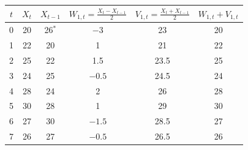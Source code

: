 \begin{tabular}{cccccc}
\toprule
$t$ & $X_t$ & $X_{t-1}$ & $W_{1,t}=\frac{X_t-X_{t-1}}{2}$ & $V_{1,t}=\frac{X_t+X_{t-1}}{2}$ & $W_{1,t}+V_{1,t}$ \\
\midrule
0 & 20 & 26$^{\ast}$ & $-3$ & 23 & 20 \\
1 & 22 & 20 & 1 & 21 & 22 \\
2 & 25 & 22 & 1.5 & 23.5 & 25 \\
3 & 24 & 25 & $-0.5$ & 24.5 & 24 \\
4 & 28 & 24 & 2 & 26 & 28 \\
5 & 30 & 28 & 1 & 29 & 30 \\
6 & 27 & 30 & $-1.5$ & 28.5 & 27 \\
7 & 26 & 27 & $-0.5$ & 26.5 & 26 \\
\bottomrule
\end{tabular}
